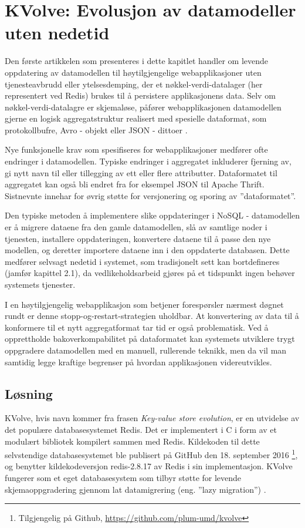 \section{KVolve: Evolusjon av datamodeller uten nedetid}

Den første artikkelen som presenteres i dette kapitlet handler om levende oppdatering av datamodellen til høytilgjengelige webapplikasjoner uten tjenesteavbrudd eller ytelsesdemping, der et nøkkel-verdi-datalager (her representert ved Redis) brukes til å persistere applikasjonens data. Selv om nøkkel-verdi-datalagre er skjemaløse, påfører webapplikasjonen datamodellen gjerne en logisk aggregatstruktur realisert med spesielle dataformat, som protokollbufre, Avro - objekt eller JSON - dittoer \citep{saur2016}.

Nye funksjonelle krav som spesifiseres for webapplikasjoner medfører ofte endringer i datamodellen.  Typiske endringer i aggregatet inkluderer fjerning av, gi nytt navn til eller tillegging av ett eller flere attributter. Dataformatet til aggregatet kan også bli endret fra for eksempel JSON til Apache Thrift. Sistnevnte innehar for øvrig støtte for versjonering og sporing av ''dataformatet''.

Den typiske metoden å implementere slike oppdateringer i NoSQL - datamodellen er å migrere dataene fra den gamle datamodellen, slå av samtlige noder i tjenesten, installere oppdateringen, konvertere dataene til å passe den nye modellen, og deretter importere dataene inn i den oppdaterte databasen. Dette medfører selvsagt nedetid i systemet, som tradisjonelt sett kan bortdefineres (jamfør kapittel 2.1), da vedlikeholdsarbeid gjøres på et tidspunkt ingen behøver systemets tjenester.

I en høytilgjengelig webapplikasjon som betjener forespørsler nærmest døgnet rundt er denne stopp-og-restart-strategien uholdbar. At konvertering av data til å konformere til et nytt aggregatformat tar tid er også problematisk. Ved å opprettholde bakoverkompabilitet på dataformatet kan systemets utviklere trygt oppgradere datamodellen med en manuell, rullerende teknikk, men da vil man samtidig legge kraftige begrenser på hvordan applikasjonen videreutvikles.

\subsection{Løsning}
KVolve, hvis navn kommer fra frasen \emph{Key-value store evolution}, er en utvidelse av det populære databasesystemet Redis. Det er implementert i C i form av et modulært bibliotek kompilert sammen med Redis. Kildekoden til dette selvstendige databasesystemet ble publisert på GitHub den 18. september 2016 \footnote{Tilgjengelig på Github, \url{https://github.com/plum-umd/kvolve}}, og benytter kildekodeversjon redis-2.8.17 av Redis i sin implementasjon. KVolve fungerer som et eget databasesystem som tilbyr støtte for levende skjemaoppgradering gjennom lat datamigrering (eng. ''lazy migration'') \citep{saur2016}.

